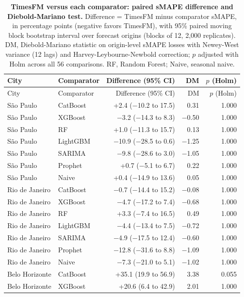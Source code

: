 \documentclass[10pt,letterpaper]{article}
\begin{document}
\begin{longtable}{llrrr}
\caption{\textbf{TimesFM versus each comparator: paired sMAPE difference and Diebold-Mariano test.} Difference = TimesFM minus comparator sMAPE, in percentage points (negative favors TimesFM), with 95\% paired moving block bootstrap interval over forecast origins (blocks of 12, 2,000 replicates). DM, Diebold-Mariano statistic on origin-level sMAPE losses with Newey-West variance (12 lags) and Harvey-Leybourne-Newbold correction; $p$ adjusted with Holm across all 56 comparisons. RF, Random Forest; Naive, seasonal naive.}\label{tabF}\\
\toprule
City & Comparator & Difference (95\% CI) & DM & $p$ (Holm) \\
\midrule
\endfirsthead
\toprule
City & Comparator & Difference (95\% CI) & DM & $p$ (Holm) \\
\midrule
\endhead
S\~ao Paulo & CatBoost & +2.4 ($-$10.2 to 17.5) & 0.31 & 1.000 \\
S\~ao Paulo & XGBoost & $-$3.2 ($-$14.3 to 8.3) & $-$0.50 & 1.000 \\
S\~ao Paulo & RF & +1.0 ($-$11.3 to 15.7) & 0.13 & 1.000 \\
S\~ao Paulo & LightGBM & $-$10.9 ($-$28.5 to 0.6) & $-$1.25 & 1.000 \\
S\~ao Paulo & SARIMA & $-$9.8 ($-$28.6 to 3.0) & $-$1.05 & 1.000 \\
S\~ao Paulo & Prophet & +0.7 ($-$5.1 to 6.7) & 0.22 & 1.000 \\
S\~ao Paulo & Naive & +0.4 ($-$14.9 to 13.6) & 0.05 & 1.000 \\
Rio de Janeiro & CatBoost & $-$0.7 ($-$14.4 to 15.2) & $-$0.08 & 1.000 \\
Rio de Janeiro & XGBoost & $-$4.7 ($-$17.2 to 7.4) & $-$0.68 & 1.000 \\
Rio de Janeiro & RF & +3.3 ($-$7.4 to 16.5) & 0.49 & 1.000 \\
Rio de Janeiro & LightGBM & $-$4.4 ($-$13.4 to 7.5) & $-$0.72 & 1.000 \\
Rio de Janeiro & SARIMA & $-$4.9 ($-$17.5 to 12.4) & $-$0.60 & 1.000 \\
Rio de Janeiro & Prophet & $-$12.8 ($-$31.6 to 8.8) & $-$1.09 & 1.000 \\
Rio de Janeiro & Naive & $-$7.3 ($-$21.0 to 5.1) & $-$1.02 & 1.000 \\
Belo Horizonte & CatBoost & +35.1 (19.9 to 56.9) & 3.38 & 0.055 \\
Belo Horizonte & XGBoost & +20.6 (6.4 to 42.9) & 2.01 & 1.000 \\

\end{longtable}
\end{document}

